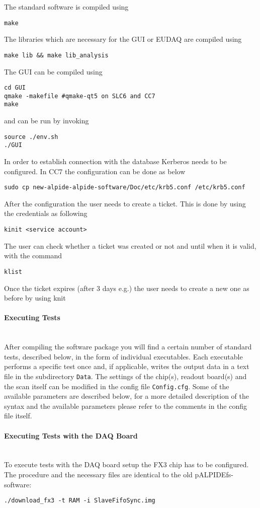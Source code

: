 \documentclass{article}
\begin{document}
The standard software is compiled using
\begin{lstlisting}
make
\end{lstlisting}
The libraries which are necessary for the GUI or EUDAQ are compiled using
\begin{lstlisting}
make lib && make lib_analysis
\end{lstlisting}
The GUI can be compiled using
\begin{lstlisting}
cd GUI
qmake -makefile #qmake-qt5 on SLC6 and CC7
make
\end{lstlisting}
and can be run by invoking
\begin{lstlisting}
source ./env.sh
./GUI
\end{lstlisting}
In order to establish connection with the database Kerberos needs to be configured. In CC7 the configuration can be done as below
\begin{lstlisting}
sudo cp new-alpide-alpide-software/Doc/etc/krb5.conf /etc/krb5.conf
\end{lstlisting}
After the configuration the user needs to create a ticket. This is done by using
the credentials as following
\begin{lstlisting}
kinit <service account>
\end{lstlisting}
The user can check whether a ticket was created or not and until when it is valid, with the command
\begin{lstlisting}
klist
\end{lstlisting}
Once the ticket expires (after 3 days e.g.) the user needs to create a new one as before by using knit

\paragraph{Executing Tests}\hfill \\
After compiling the software package you will find a certain number of standard tests, described below, in the form of individual executables. Each executable performs a specific test once and, if applicable, writes the output data in a text file in the subdirectory \texttt{Data}. The settings of the chip(s), readout board(s) and the scan itself can be modified in the config file \texttt{Config.cfg}. Some of the available parameters are described below, for a more detailed description of the syntax and the available parameters please refer to the comments in the config file itself.

\paragraph{Executing Tests with the DAQ Board}\hfill \\
To execute tests with the DAQ board setup the FX3 chip has to be configured. The procedure and the necessary files are identical to the old pALPIDEfs-software:
\begin{verbatim}
./download_fx3 -t RAM -i SlaveFifoSync.img
\end{verbatim}
\end{document}
